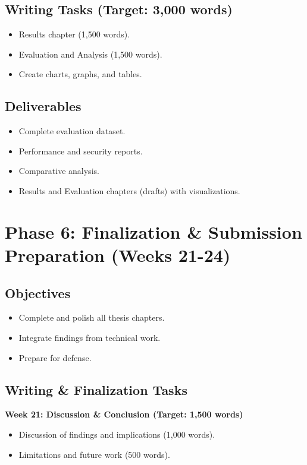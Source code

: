 \documentclass[12pt,a4paper]{article}
\begin{document}
\subsection*{Writing Tasks (Target: 3,000 words)}

\begin{itemize}
    \item Results chapter (1,500 words).
    \item Evaluation and Analysis (1,500 words).
    \item Create charts, graphs, and tables.
\end{itemize}

\subsection*{Deliverables}

\begin{itemize}
    \item Complete evaluation dataset.
    \item Performance and security reports.
    \item Comparative analysis.
    \item Results and Evaluation chapters (drafts) with visualizations.
\end{itemize}

\section{Phase 6: Finalization \& Submission Preparation (Weeks 21-24)}

\subsection*{Objectives}

\begin{itemize}
    \item Complete and polish all thesis chapters.
    \item Integrate findings from technical work.
    \item Prepare for defense.
\end{itemize}

\subsection*{Writing \& Finalization Tasks}

\textbf{Week 21: Discussion \& Conclusion (Target: 1,500 words)}
\begin{itemize}
    \item Discussion of findings and implications (1,000 words).
    \item Limitations and future work (500 words).
\end{itemize}
\end{document}
